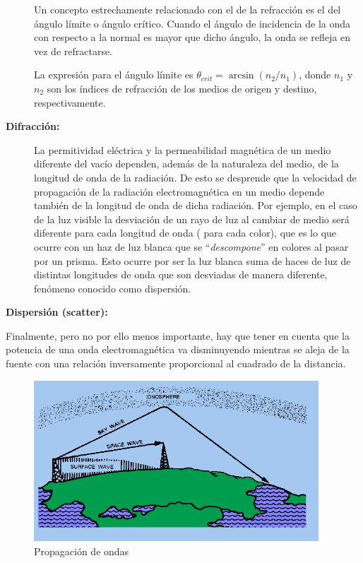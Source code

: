\begin{description}
Un concepto estrechamente relacionado con el de la refracci\'on es el
del \'angulo l\'imite o \'angulo cr\'itico. Cuando el \'angulo de
incidencia de la onda con respecto a la normal es mayor que dicho
\'angulo, la onda se refleja en vez de refractarse.

La expresi\'on para el \'angulo l\'imite es  $ \theta_{crit} =
\arcsin(n_2/n_1) $, donde $n_1$ y $n_2$ son los \'indices de
refracci\'on de los medios de origen y destino, respectivamente.

\item[\bf Difracci\'on:]

La permitividad eléctrica y la permeabilidad magnética de un medio diferente del vacío dependen, además de la naturaleza del medio, de la longitud de onda de la radiación. De esto se desprende que la velocidad de propagación de la radiación electromagnética en un medio depende también de la longitud de onda de dicha radiación. Por ejemplo, en el caso de la luz visible la desviación de un rayo de luz al cambiar de medio será diferente para cada longitud de onda ( para cada color), que es lo que ocurre con  un haz de luz blanca que se ``\emph{descompone}'' en colores al pasar por un prisma. Esto ocurre por ser la luz blanca  suma de haces de luz de distintas longitudes de onda que son desviadas de manera diferente, fenómeno conocido como dispersión. 

\item[\bf Dispersi\'on (scatter):] 




  
\end{description}


Finalmente, pero no por ello menos importante, hay que tener en cuenta
que la potencia de una onda electromagn\'etica va disminuyendo
mientras se aleja de la fuente con una relaci\'on inversamente
proporcional al cuadrado de la distancia.



\begin{figure}[!h]
  \centering
  \includegraphics[width=0.95\textwidth]{06.radionavegacion/Imagenes/06.01.adf/propagacion-ondas.gif}
  \caption{Propagaci\'on de ondas}
  \label{fig:propagacion.de.ondas}
\end{figure}

